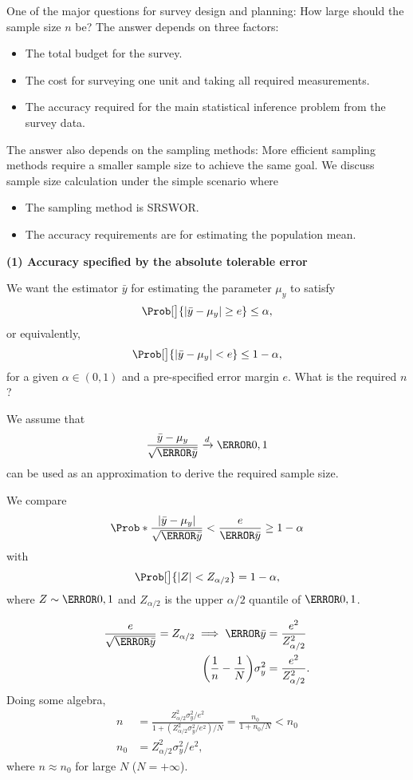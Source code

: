 One of the major questions for survey design and planning: How large
should the sample size $n$ be? The answer depends on three factors:
\begin{itemize}
      \item The total budget for the survey.
      \item The cost for surveying one unit and taking all required
            measurements.
      \item The accuracy required for the main statistical inference problem
            from the survey data.
\end{itemize}
The answer also depends on the sampling methods: More efficient
sampling methods require a smaller sample size to achieve the same
goal. We discuss sample size calculation under the simple scenario
where
\begin{itemize}
      \item The sampling method is SRSWOR\@.
      \item The accuracy requirements are for estimating the population
            mean.
\end{itemize}


\textbf{(1) Accuracy specified by the absolute tolerable error}

We want the estimator $ \bar{y} $ for estimating the parameter $ \mu_y $ to satisfy
\[ \Prob[\big]{\abs{\bar{y}-\mu_y}\ge e}\le \alpha, \]
or equivalently,
\[ \Prob[\big]{\abs{\bar{y}-\mu_y}< e}\le 1-\alpha, \]
for a given $ \alpha\in(0,1) $ and a pre-specified error margin $ e $. What is the required $ n $?

We assume that
\[ \frac{\bar{y}-\mu_y}{\sqrt{\V{\bar{y}}}}\tod \N{0,1} \]
can be used as an approximation to derive the required sample size.

We compare
\[ \Prob*{\frac{\abs{\bar{y}-\mu_y}}{\sqrt{\V{\bar{y}}}}<\frac{e}{\V{\bar{y}}}}\ge 1-\alpha \]
with
\[ \Prob[\big]{\abs{Z}<Z_{\alpha/2}}=1-\alpha, \]
where $ Z \sim \N{0,1} $ and $ Z_{\alpha/2} $ is the upper $ \alpha/2 $ quantile of $ \N{0,1} $.

\begin{align*}
      \frac{e}{\sqrt{\V{\bar{y}}}}=Z_{\alpha/2}\implies\V{\bar{y}} & =\frac{e^2}{Z_{\alpha/2}^2}  \\
      \biggl(\frac{1}{n}-\frac{1}{N}\biggr)\sigma_y^2              & =\frac{e^2}{Z_{\alpha/2}^2}.
\end{align*}
Doing some algebra,
\begin{align*}
      n   & =\frac{Z_{\alpha/2}^2\sigma_y^2/e^2}{1+(Z_{\alpha/2}^2\sigma_y^2/e^2)/N}=\frac{n_0}{1+n_0/N}<n_0 \\
      n_0 & =Z_{\alpha/2}^2\sigma_y^2/e^2,
\end{align*}
where $n\approx n_0 $ for large $ N $ ($ N=+\infty $).

